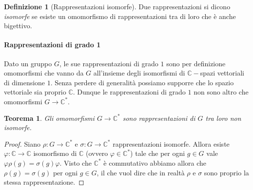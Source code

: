 \documentclass[11pt]{article}
\theoremstyle{plain}
\newtheorem{thm}{Teorema}[section]
\theoremstyle{definition}
\newtheorem{defn}{Definizione}[section]
\theoremstyle{remark}
\newcommand{\C}{\mathbb{C}}
\begin{document}
\begin{defn}[Rappresentazioni isomorfe]
Due rappresentazioni si dicono \textit{isomorfe} se esiste un omomorfismo di rappresentazioni tra di loro che è anche bigettivo.
\end{defn}




\paragraph{Rappresentazioni di grado 1}\label{par:rappr_deg_1}
Dato un gruppo $G$, le sue rappresentazioni di grado $1$ sono per definizione
omomorfismi che vanno da $G$ all'insieme degli isomorfismi di $\C-$spazi vettoriali di dimensione $1$.
Senza perdere di generalità possiamo supporre che lo spazio vettoriale sia proprio $\C$. Dunque le
rappresentazioni di grado $1$ non sono altro che omomorfismi $G\to\C^*$.
\begin{thm}
Gli omomorfismi $G\to\C^*$ sono rappresentazioni di $G$ tra loro non isomorfe.
\end{thm}
\begin{proof}
Siano $\rho:G\to\C^*$ e $\sigma:G\to\C^*$ rappresentazioni isomorfe. Allora
esiste $\varphi:\C\to\C$ isomorfismo di $\C$ (ovvero $\varphi\in\C^*$) tale che per ogni $g\in G$ vale $\varphi \rho(g) = \sigma(g) \varphi$.
Visto che $\C^*$ è commutativo abbiamo allora che $\rho(g) = \sigma(g)$ per ogni $g\in G$, il che vuol dire che 
in realtà $\rho$ e $\sigma$ sono proprio la stessa rappresentazione.
\end{proof}
\end{document}

